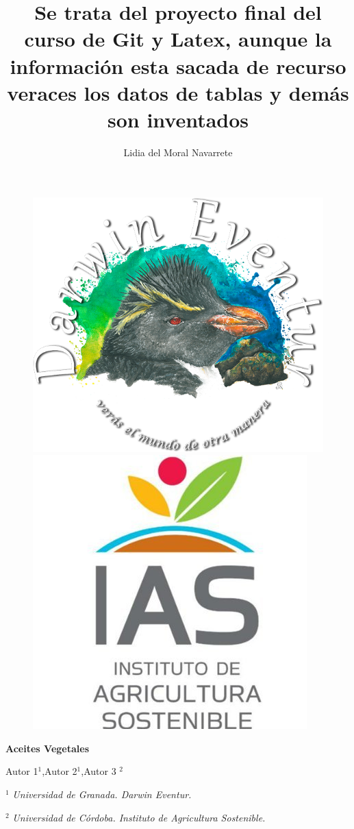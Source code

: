 \documentclass[a4paper,12pt]{article}
\author{Lidia del Moral Navarrete}
\title{Se trata del proyecto final del curso de Git y Latex, aunque la información esta sacada de recurso veraces los datos de tablas y demás son inventados}
\begin{document}
\begin{figure}[H]

\raggedright
\includegraphics[scale=0.4]{Darwin}\hfill\includegraphics[scale=0.2]{IAS}

\end{figure}

\vspace{5mm}

\begin{center}
{\textbf{\Huge Aceites Vegetales}}
\vspace{2mm}

{\large Autor 1$^{1}$,Autor 2$^{1}$,Autor 3 $^{2}$}
\vspace{5mm}

$^{1}$ \textit{Universidad de Granada. Darwin Eventur.}

$^{2}$ \textit{Universidad de Córdoba. Instituto de Agricultura Sostenible.}

\end{center}
\end{document}
